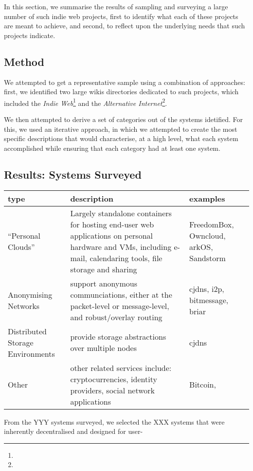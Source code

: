 \documentclass{amsart}
\begin{document}
In this section, we summarise the results of sampling and surveying a large number of such indie web projects, first to identify what each of these projects are meant to achieve, and second, to reflect upon the underlying needs that such projects indicate.

\subsection{Method}
We attempted to get a representative sample using a combination of approaches: first, we identified two large wikis directories dedicated to such projects, which included the \emph{Indie Web}\footnote{} and the \emph{Alternative Internet}\footnote{}. 

We then attempted to derive a set of categories out of the systems idetified.  For this, we used an iterative approach, in which we attempted to create the most specific descriptions that would characterise, at a high level, what each system accomplished while ensuring that each category had at least one system.

\subsection{Results: Systems Surveyed}

\begin{figure*}[tb]
\begin{tabular}{ l p{2.8in} p{2.3in} }
type & description & examples \\ \hline
  ``Personal Clouds'' & Largely standalone containers for hosting end-user web applications on personal hardware and VMs, including e-mail, calendaring tools, file storage and sharing & FreedomBox, Owncloud, arkOS, Sandstorm \\
  Anonymising Networks & support anonymous communciations, either at the packet-level or message-level, and robust/overlay routing & cjdns, i2p, bitmessage, briar \\
  Distributed Storage Environments & provide storage abstractions over multiple nodes & cjdns \\
  Other & other related services include: cryptocurrencies, identity providers, social network applications & Bitcoin, \\
\end{tabular}
\end{figure*}

From the YYY systems surveyed, we selected the XXX systems that were inherently decentralised and designed for user-
\end{document}
